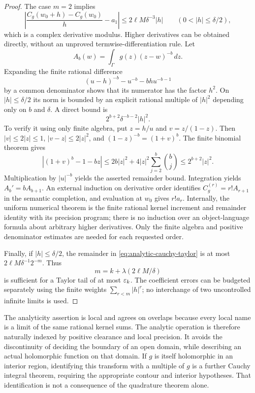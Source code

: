 \begin{proof}
The case $m=2$ implies
\[
 \left|\frac{C_g(w_0+h)-C_g(w_0)}h-a_1\right|
 \le 2\ell M\delta^{-3}|h|
 \qquad(0<|h|\le\delta/2),
\]
which is a complex derivative modulus.  Higher derivatives can be obtained directly, without an unproved termwise-differentiation rule.  Let
\[
 A_b(w)=\int_\Gamma g(z)(z-w)^{-b}\,dz.
\]
Expanding the finite rational difference
\[
 (u-h)^{-b}-u^{-b}-bhu^{-b-1}
\]
by a common denominator shows that its numerator has the factor $h^2$.  On $|h|\le\delta/2$ its norm is bounded by an explicit rational multiple of $|h|^2$ depending only on $b$ and $\delta$.  A direct bound is
\[
 2^{b+2}\delta^{-b-2}|h|^2.
\]
To verify it using only finite algebra, put $z=h/u$ and $v=z/(1-z)$.  Then $|v|\le2|z|\le1$, $|v-z|\le2|z|^2$, and $(1-z)^{-b}=(1+v)^b$.  The finite binomial theorem gives
\[
 |(1+v)^b-1-bz|
 \le 2b|z|^2+4|z|^2\sum_{j=2}^{b}\binom bj
 \le 2^{b+2}|z|^2.
\]
Multiplication by $|u|^{-b}$ yields the asserted remainder bound.  Integration yields $A_b'=bA_{b+1}$.  An external induction on derivative order identifies $C_g^{(r)}=r!A_{r+1}$ in the semantic completion, and evaluation at $w_0$ gives $r!a_r$.  Internally, the uniform numerical theorem is the finite rational kernel increment and remainder identity with its precision program; there is no induction over an object-language formula about arbitrary higher derivatives.  Only the finite algebra and positive denominator estimates are needed for each requested order.

Finally, if $|h|\le\delta/2$, the remainder in \eqref{eq:analytic-cauchy-taylor} is at most $2\ell M\delta^{-1}2^{-m}$.  Thus
\[
 m=k+\lambda(2\ell M/\delta)
\]
is sufficient for a Taylor tail of at most $\varepsilon_k$.  The coefficient errors can be budgeted separately using the finite weights $\sum_{r<m}|h|^r$; no interchange of two uncontrolled infinite limits is used.
\end{proof}

The analyticity assertion is local and agrees on overlaps because every local name is a limit of the same rational kernel sums.  The analytic operation is therefore naturally indexed by positive clearance and local precision.  It avoids the discontinuity of deciding the boundary of an open domain, while describing an actual holomorphic function on that domain.  If $g$ is itself holomorphic in an interior region, identifying this transform with a multiple of $g$ is a further Cauchy integral theorem, requiring the appropriate contour and interior hypotheses.  That identification is not a consequence of the quadrature theorem alone.

